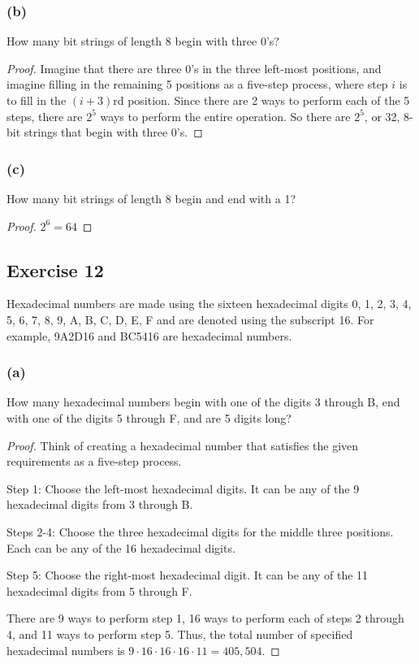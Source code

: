 \documentclass[14pt]{extarticle}
\newcommand{\cy}{\color{cyan}}
\begin{document}
\subsubsection{(b)}
How many bit strings of length 8 begin with three 0’s?

\begin{proof}
Imagine that there are three 0’s in the three left-most positions, and imagine filling in the remaining 5 positions 
as a five-step process, where step $i$ is to fill in the \((i + 3)\)rd position. Since there are 2 ways to perform 
each of the 5 steps, there are \(2^5\) ways to perform the entire operation. So there are \(2^5\), or 32, 8-bit 
strings that begin with three 0’s.
\end{proof}

\subsubsection{(c)}
How many bit strings of length 8 begin and end with a 1?

\begin{proof}
\(2^6 = 64\)
\end{proof}

\subsection{Exercise 12}
Hexadecimal numbers are made using the sixteen hexadecimal digits 0, 1, 2, 3, 4, 5, 6, 7, 8, 9, A, B, C, D, E, F and 
are denoted using the subscript 16. For example, 9A2D16 and BC5416 are hexadecimal numbers.

\subsubsection{(a)}
How many hexadecimal numbers begin with one of the digits 3 through B, end with one of the digits 5 through F, and are 
5 digits long?

\begin{proof}
Think of creating a hexadecimal number that satisfies the given requirements as a five-step process. 

{\cy Step 1:} Choose the left-most hexadecimal digits. It can be any of the 9 hexadecimal digits from 3 through B.

{\cy Steps 2-4:} Choose the three hexadecimal digits for the middle three positions. Each can be any of the 16 
hexadecimal digits.

{\cy Step 5:} Choose the right-most hexadecimal digit. It can be any of the 11 hexadecimal digits from 5 through F.

There are 9 ways to perform step 1, 16 ways to perform each of steps 2 through 4, and 11 ways to perform step 5. Thus, 
the total number of specified hexadecimal numbers is \(9 \cdot 16 \cdot 16 \cdot 16 \cdot 11 = 405,504\).
\end{proof}
\end{document}
